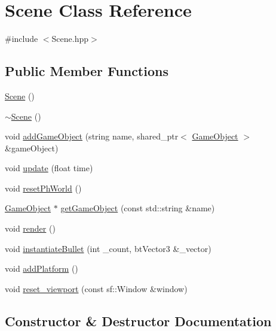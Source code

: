 \hypertarget{class_scene}{}\section{Scene Class Reference}
\label{class_scene}


{\ttfamily \#include $<$Scene.\+hpp$>$}

\subsection*{Public Member Functions}
\begin{DoxyCompactItemize}
\item 
\mbox{\hyperlink{class_scene_ad10176d75a9cc0da56626f682d083507}{Scene}} ()
\item 
\mbox{\hyperlink{class_scene_a3b8cec2e32546713915f8c6303c951f1}{$\sim$\+Scene}} ()
\item 
void \mbox{\hyperlink{class_scene_a3aeff0df4ebdc17207c48a76ed3ccfa6}{add\+Game\+Object}} (string name, shared\+\_\+ptr$<$ \mbox{\hyperlink{class_game_object}{Game\+Object}} $>$ \&game\+Object)
\item 
void \mbox{\hyperlink{class_scene_a846a5af36bafc63922980b72cd6abf96}{update}} (float time)
\item 
void \mbox{\hyperlink{class_scene_aca095a03977e82f8c5a76cf4d3752c96}{reset\+Ph\+World}} ()
\item 
\mbox{\hyperlink{class_game_object}{Game\+Object}} $\ast$ \mbox{\hyperlink{class_scene_ab16e3d00711a57b59a0e05e0ed76b671}{get\+Game\+Object}} (const std\+::string \&name)
\item 
void \mbox{\hyperlink{class_scene_a4ddf2d16f371ee9533b3faf1dd5ddfb1}{render}} ()
\item 
void \mbox{\hyperlink{class_scene_a9f729eae7d79fb819e046fbf6f2528e8}{instantiate\+Bullet}} (int \+\_\+count, bt\+Vector3 \&\+\_\+vector)
\item 
void \mbox{\hyperlink{class_scene_ac3864628aa57cecf65809bfdd00e4b6d}{add\+Platform}} ()
\item 
void \mbox{\hyperlink{class_scene_ad02fae80f6ee49025fa6ff7e68c96081}{reset\+\_\+viewport}} (const sf\+::\+Window \&window)
\end{DoxyCompactItemize}


\subsection{Constructor \& Destructor Documentation}
\mbox{\label{class_scene_ad10176d75a9cc0da56626f682d083507}} 
